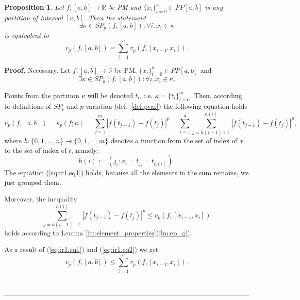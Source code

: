 \documentclass[12pt, a4paper]{article}
\newtheorem{proposition}[theorem]{Proposition}
\newenvironment{proof}[1][Proof]{\noindent \textbf{#1.} }{\  \rule{0.5em}{0.5em}}
\numberwithin{equation}{section}
\begin{document}
\begin{proposition}\label{prop:pvar_sum_x} 
  Let $f:[a,b] \rightarrow \mathbb{R}$ be PM and
  $\{x_i\}_{i=0}^n \in PP[a,b]$ is any partition of interval $[a,b]$. 
  Then the statement 
  \begin{equation}
    \exists \kappa \in SP_{p}(f,[a,b]):\forall i,x_i \in \kappa
  \end{equation}
  is equivalent to 
  \begin{equation}
    v_p(f,[a,b]) = \sum_{i=1}^n v_p(f,[x_{i-1},x_i]).
  \end{equation}
\end{proposition}
\begin{proof}
  Necessary. Let $f:[a,b] \rightarrow \mathbb{R}$ be PM,
  $\{x_i\}_{i=0}^n \in PP[a,b]$ and 
  \begin{equation}
    \exists \kappa \in SP_{p}(f,[a,b]):\forall i,x_i \in \kappa. 
  \end{equation}
  
  Points from the partition $\kappa$ will be denoted $t_i$, 
  i.e. $\kappa=\{t_i\}_{i=0}^m$.
  Then, according to definitions of $SP_{p}$ and 
  $p$-variation (def.~\ref{def:pvar}) the following equation holds
  \begin{equation}\label{eq:ir1.eq1}
  v_p(f,[a,b])=s_{p}(f;\kappa)=\sum_{j=1}^{m}|f(t_{j-1})-f(t_j)|^p 
    = \sum_{i=1}^n\sum_{j=h(i-1)+1}^{h(i)}|f(t_{j-1})-f(t_j)|^p,
  \end{equation}  
  where $h:\{0,1,\dots,n\} \rightarrow \{0,1,\dots,m\}$ 
  denotes a function 
  from the set of index of $x$ to the set of index of $t$, namely:
  \begin{equation}\label{eq:ir1.eqx1}
    h(i):=(j_i : x_i = t_{j_i}=t_{h(i)}).
  \end{equation}  
  The equation (\ref{eq:ir1.eq1}) holds, because all the elements 
  in the sum remains, we just grouped them.
  
  Moreover, the inequality  
  \begin{equation}\label{eq:ir1.eq2}
  \sum_{j=h(i-1)+1}^{h(i)}|f(t_{j-1})-f(t_j)|^p 
    \leq v_p(f,[x_{i-1},x_i])
  \end{equation}  
  holds according to Lemma \ref{lm:element_properties}(\ref{lm:ep_g}).
  
  As a result of (\ref{eq:ir1.eq1}) and (\ref{eq:ir1.eq2}) we get
  \begin{equation}\label{eq:ir1.eq3}
    v_p(f,[a,b]) \leq \sum_{i=1}^n v_p(f,[x_{i-1},x_i]).
  \end{equation}
  

\end{proof}
\end{document}
